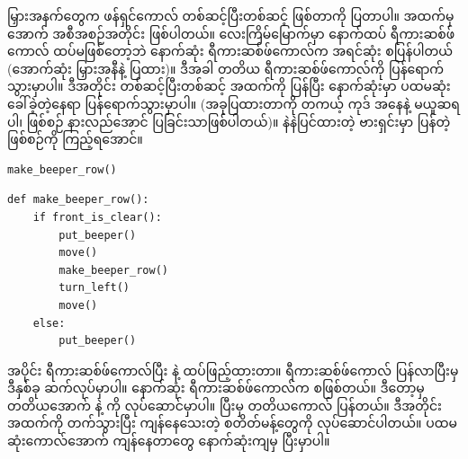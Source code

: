 မြှားအနက်တွေက ဖန်ရှင်ကောလ်  တစ်ဆင့်ပြီးတစ်ဆင့် ဖြစ်တာကို ပြတာပါ။ အထက်မှအောက် အစီ\allowbreak အစဉ်အတိုင်း ဖြစ်ပါတယ်။ ‌လေးကြိမ်မြောက်မှာ နောက်ထပ် ရီကားဆစ်ဖ်ကောလ် ထပ်မဖြစ်တော့ဘဲ နောက်ဆုံး ရီကားဆစ်ဖ်ကောလ်က အရင်ဆုံး  စပြန်ပါတယ် (အောက်ဆုံး မြှားအနီနဲ့ ပြထား)။ ဒီအခါ တတိယ ရီကားဆစ်ဖ်ကောလ်ကို ပြန်ရောက်သွားမှာပါ။ ဒီအတိုင်း တစ်ဆင့်ပြီးတစ်ဆင့် အထက်ကို  ပြန်ပြီး နောက်ဆုံးမှာ ပထမဆုံး ခေါ်ခဲ့တဲ့နေရာ ပြန်ရောက်သွားမှာပါ။ (အခုပြထားတာကို တကယ့်  ကုဒ် အနေနဲ့ မယူဆရပါ၊ ဖြစ်စဉ် နားလည်အောင် ပြခြင်းသာဖြစ်ပါတယ်)။ နဲနဲပြင်ထားတဲ့   ဗားရှင်းမှာ  ပြန်တဲ့ ဖြစ်စဉ်ကို ကြည့်ရအောင်။ 

%
\setlength{\fboxsep}{0pt}
\begin{verbatim}
make_beeper_row()
\end{verbatim}
%
\betweenminted{\medskipamount}
%
\setlength{\fboxsep}{0pt}
\begin{verbatim}
def make_beeper_row():
    if front_is_clear():
        put_beeper()
        move()
        make_beeper_row()
        turn_left()
        move()
    else:
        put_beeper()
\end{verbatim}
%
\btwntikzannoandpar

  အပိုင်း ရီကားဆစ်ဖ်ကောလ်ပြီး   နဲ့  ထပ်ဖြည့်ထားတာ။  ရီကားဆစ်ဖ်ကောလ်  ပြန်လာပြီးမှ ဒီနှစ်ခု ဆက်လုပ်မှာပါ။  နောက်ဆုံး ရီကားဆစ်ဖ်ကောလ်က  စဖြစ်တယ်။ ဒီတော့မှ တတိယအောက်  နဲ့  ကို လုပ်ဆောင်မှာပါ။ ပြီးမှ တတိယကောလ်  ပြန်တယ်။ ဒီအတိုင်း အထက်ကို တက်သွားပြီး ကျန်နေသေးတဲ့ စတိတ်မန့်တွေကို လုပ်ဆောင်ပါတယ်။ ပထမဆုံးကောလ်အောက် ကျန်နေတာတွေ နောက်ဆုံးကျမှ ပြီးမှာပါ။

